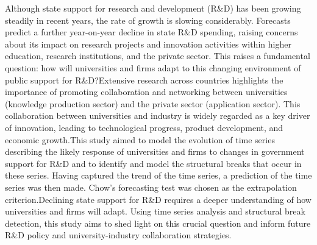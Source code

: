 
\begin{Abstrakt}
    Although state support for research and development (R\&D) has been growing steadily in recent years, the rate of growth is slowing considerably. Forecasts predict a further year-on-year decline in state R\&D spending, raising concerns about its impact on research projects and innovation activities within higher education, research institutions, and the private sector. This raises a fundamental question: how will universities and firms adapt to this changing environment of public support for R\&D?\newline Extensive research across countries highlights the importance of promoting collaboration and networking between universities (knowledge production sector) and the private sector (application sector). This collaboration between universities and industry is widely regarded as a key driver of innovation, leading to technological progress, product development, and economic growth.\newline This study aimed to model the evolution of time series describing the likely response of universities and firms to changes in government support for R\&D and to identify and model the structural breaks that occur in these series. Having captured the trend of the time series, a prediction of the time series was then made. Chow's forecasting test was chosen as the extrapolation criterion.\newline Declining state support for R\&D requires a deeper understanding of how universities and firms will adapt. Using time series analysis and structural break detection, this study aims to shed light on this crucial question and inform future R\&D policy and university-industry collaboration strategies.
\end{Abstrakt}



\clearpage